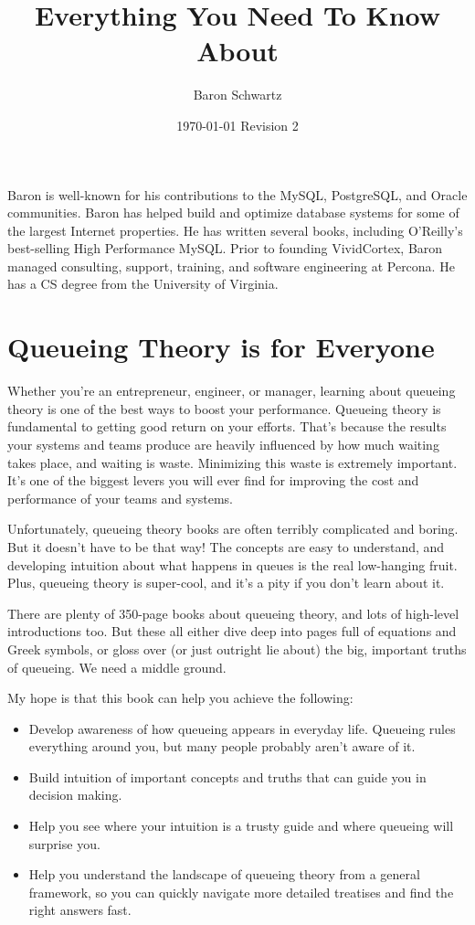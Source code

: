 \documentclass{vivid_layout_pdf}
\title{Everything You Need To Know About}{Queueing Theory}
\date{\today{} \textbullet{} Revision 2}
\author{Baron Schwartz}{img/baron}
\begin{document}
\maketitle		%
\begin{bio}		%
Baron is well-known for his contributions to the MySQL, PostgreSQL, and Oracle communities. Baron has helped build and optimize database systems for some of the largest Internet properties. He has written several books, including O'Reilly's best-selling High Performance MySQL. Prior to founding VividCortex, Baron managed consulting, support, training, and software engineering at Percona. He has a CS degree from the University of Virginia.
\end{bio}
\tableofcontents	%

\section{Queueing Theory is for Everyone}

Whether you're an entrepreneur, engineer, or manager, learning about queueing theory is one of the best ways to boost your performance. Queueing theory is fundamental to getting good return on your efforts. That's because the results your systems and teams produce are heavily influenced by how much waiting takes place, and waiting is waste. Minimizing this waste is extremely important. It's one of the biggest levers you will ever find for improving the cost and performance of your teams and systems.

Unfortunately, queueing theory books are often terribly complicated and boring. But it doesn't have to be that way! The concepts are easy to understand, and developing intuition about what happens in queues is the real low-hanging fruit. Plus, queueing theory is super-cool, and it's a pity if you don't learn about it.

There are plenty of 350-page books about queueing theory, and lots of high-level introductions too. But these all either dive deep into pages full of equations and Greek symbols, or gloss over (or just outright lie about) the big, important truths of queueing. We need a middle ground.

My hope is that this book can help you achieve the following:

\begin{itemize}
\item Develop awareness of how queueing appears in everyday life. Queueing rules everything around you, but many people probably aren't aware of it.
\item Build intuition of important concepts and truths that can guide you in decision making.
\item Help you see where your intuition is a trusty guide and where queueing will surprise you.
\item Help you understand the landscape of queueing theory from a general framework, so you can quickly navigate more detailed treatises and find the right answers fast.
\end{itemize}
\end{document}
